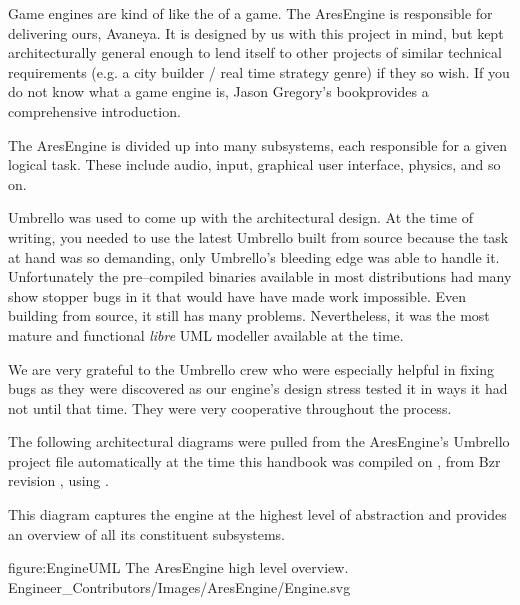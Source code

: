 

Game engines are kind of like the  of a game. The AresEngine is responsible for delivering ours, Avaneya. It is designed by us with this project in mind, but kept architecturally general enough to lend itself to other projects of similar technical requirements (e.g. a city builder / real time strategy genre) if they so wish. If you do not know what a game engine is, Jason Gregory's book provides a comprehensive introduction.

The AresEngine is divided up into many subsystems, each responsible for a given logical task. These include audio, input, graphical user interface, physics, and so on.

Umbrello was used to come up with the architectural design. At the time of writing, you needed to use the latest Umbrello built from source because the task at hand was so demanding, only Umbrello's bleeding edge was able to handle it. Unfortunately the pre--compiled binaries available in most distributions had many show stopper bugs in it that would have have made work impossible. Even building from source, it still has many problems. Nevertheless, it was the most mature and functional {\it libre} UML modeller available at the time. 

We are very grateful to the Umbrello crew who were especially helpful in fixing bugs as they were discovered as our engine's design stress tested it in ways it had not until that time. They were very cooperative throughout the process.

The following architectural diagrams were pulled from the AresEngine's Umbrello project file automatically at the time this handbook was compiled on \currentdate, from Bzr revision \BzrRevisionClickable, using \UmbrelloVersion.

This diagram captures the engine at the highest level of abstraction and provides an overview of all its constituent subsystems.

\FullPageDiagram
    {figure:EngineUML}
    {The AresEngine high level overview.}
    {Engineer_Contributors/Images/AresEngine/Engine.svg}


